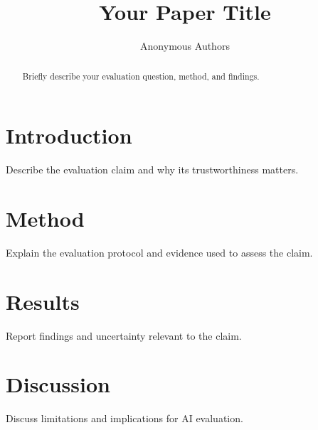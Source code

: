 \documentclass{article}
\title{Your Paper Title}
\author{Anonymous Authors}
\begin{document}
\maketitle

\begin{abstract}
Briefly describe your evaluation question, method, and findings.
\end{abstract}

\section{Introduction}
Describe the evaluation claim and why its trustworthiness matters.

\section{Method}
Explain the evaluation protocol and evidence used to assess the claim.

\section{Results}
Report findings and uncertainty relevant to the claim.

\section{Discussion}
Discuss limitations and implications for AI evaluation.
\end{document}
